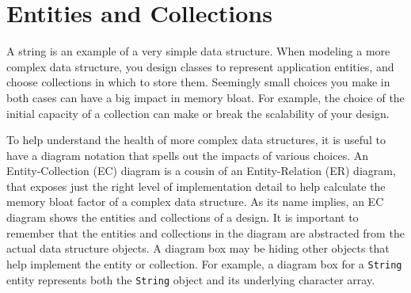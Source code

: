 \section{Entities and Collections}

A string is an example of a very simple data structure.  When
modeling a more complex data structure, you design classes to
represent application entities, and choose collections in which to
store them. Seemingly small choices you make in both cases can have a
big impact in memory bloat. For example, the choice of the initial
capacity of a collection can make or break the scalability of your
design. 

To help understand the health of more complex data structures, it is
useful to have a diagram notation that spells out the impacts of various choices.  An Entity-Collection (EC) diagram is a cousin of an Entity-Relation (ER) diagram, that exposes just the right level of implementation detail to help calculate the memory bloat
factor of a complex data structure. As its name implies, an EC diagram shows the entities and collections of a design. It is important to remember that the entities and collections in the diagram are abstracted from the actual data structure objects. A diagram box may be hiding other objects that help implement the entity or collection. For example, a diagram box for a \texttt{String} entity represents both the \texttt{String} object and its underlying character
array. 


